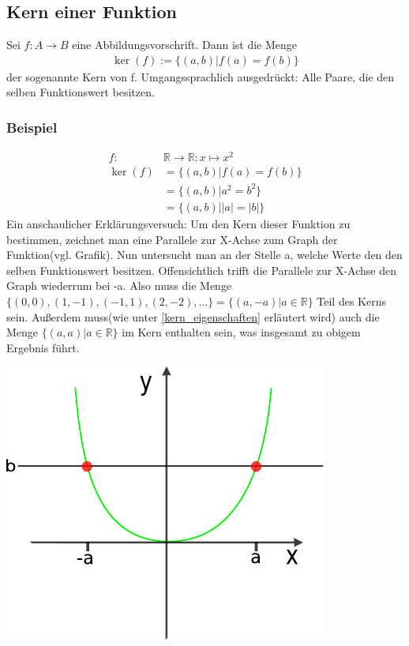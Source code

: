\subsection{Kern einer Funktion}
Sei $f:{A}\longrightarrow{B}$ eine Abbildungsvorschrift.
Dann ist die Menge
\begin{align*}
   \ker(f) := \{(a,b) | f(a)=f(b)\} %
\end{align*}
der sogenannte Kern von f.
Umgangssprachlich ausgedrückt: Alle Paare, die den selben Funktionswert besitzen.
\subsubsection{Beispiel}
\begin{align*}
  f: &\mathbb{R} \rightarrow \mathbb{R} : {x}\longmapsto{x^2} \\
  \ker(f) &= \{(a,b) | f(a)=f(b) \} \\
         &= \{ (a,b) | a^2 = b^2 \} \\
         &= \{ (a,b) | |a| =|b| \}
\end{align*}
Ein anschaulicher Erklärungsversuch: Um den Kern dieser Funktion zu bestimmen, zeichnet man eine Parallele zur X-Achse zum Graph der Funktion(vgl. Grafik).
Nun untersucht man an der Stelle a, welche Werte den den selben Funktionswert besitzen. Offensichtlich trifft die Parallele zur X-Achse den Graph wiederrum bei -a. 
Also muss die Menge $\{(0,0),(1,-1),(-1,1),(2,-2), ...\} = \{ (a,-a) | a \in \mathbb{R} \}$ Teil des Kerns sein.
Außerdem muss(wie unter \ref{kern_eigenschaften} erläutert wird) auch die Menge $\{(a,a) | a \in \mathbb{R} \}$ im Kern enthalten sein, was insgesamt zu obigem Ergebnis führt. 
\begin{center}
 \includegraphics[keepaspectratio=true]{../bilder/parabel_kernsvg.pdf}
\end{center}

